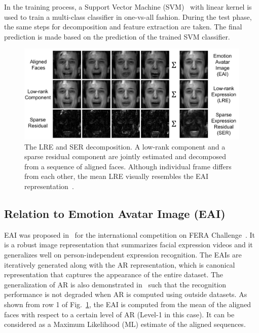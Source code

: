 \documentclass[journal]{IEEEtran}
\begin{document}
In the training process, a Support Vector Machine (SVM)~\cite{libsvm} with linear kernel is used to train a multi-class classifier in one-vs-all fashion. During the test phase, the same steps for decomposition and feature extraction are taken. The final prediction is made based on the prediction of the trained SVM classifier.  

\begin{figure}[!t]
	\centering
		\includegraphics[width=\columnwidth]{pics/low_rank_sparse}
	\caption{The LRE and SER decomposition. A low-rank component and a sparse residual component are jointly estimated and decomposed from a sequence of aligned faces. Although individual frame differs from each other, the mean LRE visually resembles the EAI representation~\cite{Yang_SMCB12}.}
	\label{fig:low_rank_sparse}
\end{figure}

\subsection{Relation to Emotion Avatar Image (EAI) \label{sec:eai}}

EAI was proposed in~\cite{Yang_SMCB12} for the international competition on FERA Challenge~\cite{FERA11}. It is a robust image representation that summarizes facial expression videos and it generalizes well on person-independent expression recognition. The EAIs are iteratively generated along with the AR representation, which is canonical representation that captures the appearance of the entire dataset. The generalization of AR is also demonstrated in~\cite{Yang_SMCB12} such that the recognition performance is not degraded when AR is computed using outside datasets. As shown from row 1 of Fig.~\ref{fig:low_rank_sparse}, the EAI is computed from the mean of the aligned faces with respect to a certain level of AR (Level-1 in this case). It can be considered as a Maximum Likelihood (ML) estimate of the aligned sequences. 
\end{document}
